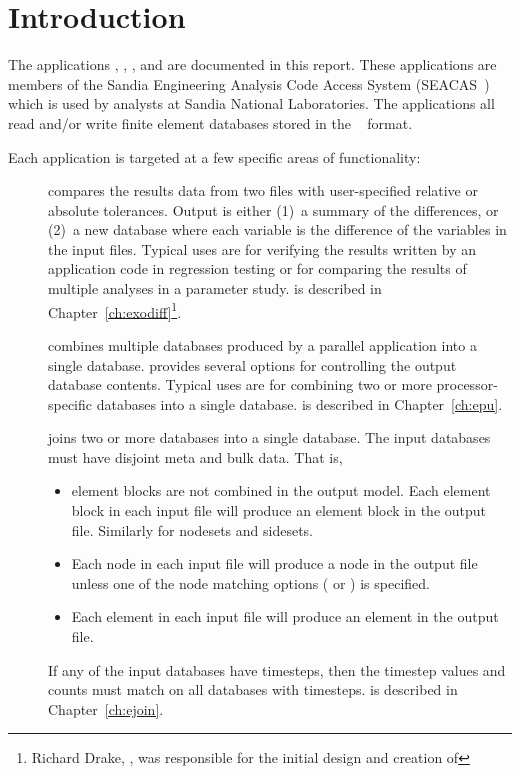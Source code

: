 \chapter{Introduction}

The applications \exodiff{}, \epu{}, \ejoin{}, and \conjoin{} are
documented in this report.  These applications are members of the
Sandia Engineering Analysis Code Access System (SEACAS~\cite{bib:seacas})
which is used by analysts at Sandia National Laboratories.  The
applications all read and/or write finite element databases stored in
the \exo{}~\cite{bib:exodus} format.

Each application is targeted at a few specific areas of functionality:

\begin{description}
\item[\exodiff] compares the results data from two \exo{} files with 
user-specified relative or absolute tolerances. Output is either (1)~a
summary of the differences, or (2)~a new \exo{} database where each
variable is the difference of the variables in the input files.
Typical uses are for verifying the results written by an application
code in regression testing or for comparing the results of multiple
analyses in a parameter study. \exodiff{} is described in
Chapter~\ref{ch:exodiff}\footnote{Richard Drake, \SNLA, was
responsible for the initial design and creation of \exodiff}.

\item[\epu] combines multiple \exo{} databases produced by a parallel
application into a single \exo{} database.  \epu{} provides several
options for controlling the output database contents.  Typical uses
are for combining two or more processor-specific \exo{} databases into
a single \exo{} database.
\epu{} is described in Chapter~\ref{ch:epu}. 

\item[\ejoin] joins two or more \exo{} databases into a single
\exo{} database. The input databases must have disjoint meta and bulk data.
That is, 
\begin{itemize}
\item element blocks are not combined in the output model.  Each
element block in each input file will produce an element block in the
output file. Similarly for nodesets and sidesets.
\item Each node in each input file will produce a node in the output
file unless one of the node matching options
( or ) is specified.
\item Each element in each input file will produce an element in the
output file. 
\end{itemize}
If any of the input databases have timesteps, then the timestep values
and counts must match on all databases with timesteps.
\ejoin{} is described in Chapter~\ref{ch:ejoin}. 


\end{description}
